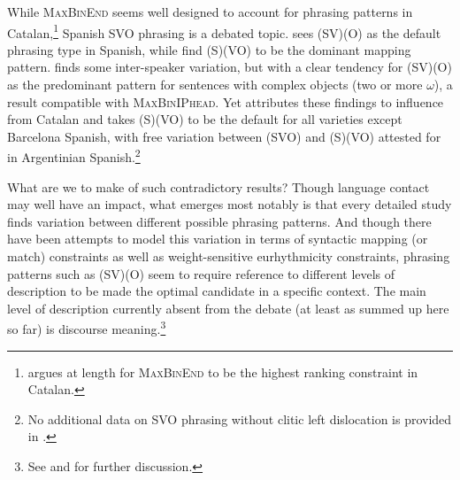While \textsc{MaxBinEnd} seems well designed to account for phrasing 
patterns in Catalan,\footnote{\citet[103--126]{Feldhausen.2010diss} argues 
at length for \textsc{MaxBinEnd} to be the highest ranking constraint in 
Catalan.} Spanish SVO phrasing is a debated topic. \citet{Nibert.2000} 
sees (SV)(O) as the default phrasing type in Spanish, while 
\citet{ElordietaETAL.2003,ElordietaETAL.2005} find (S)(VO) to be the 
dominant mapping pattern. \citet{Prieto.2006} finds some inter-spea\-ker 
variation, but with a clear tendency for (SV)(O) as the predominant 
pattern for sentences with complex objects (two or more $\omega$), a 
result compatible with \textsc{MaxBinIPhead}. Yet 
\citet[111--115]{Feldhausen.2014} attributes these findings to influence 
from Catalan and takes (S)(VO) to be the default for all varieties except 
Barcelona Spanish, with free variation between (SVO) and (S)(VO) attested 
for in Argentinian Spanish.\footnote{No additional data on SVO phrasing 
without clitic left dislocation is provided in \citet{Feldhausen.2014}.} 

What are we to make of such contradictory results? Though language contact 
may well have an impact, what emerges most notably is that every detailed 
study finds variation between different possible phrasing patterns. And 
though there have been attempts to model this variation in terms of 
syntactic mapping (or match) constraints as well as weight-sensitive 
eurhythmicity constraints, phrasing patterns such as (SV)(O) seem to 
require reference to different levels of description to be made the 
optimal candidate in a specific context. The main level of description 
currently absent from the debate (at least as summed up here so far) is discourse meaning.\footnote{See  and  for further discussion.}


%

